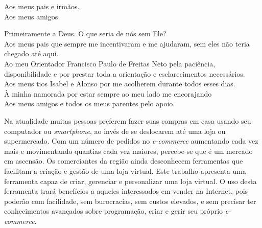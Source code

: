 \documentclass[a4paper,12pt]{monografia}
\begin{document}
%
  
%
\tecnologo {} 
%
 
\unidadeacademica{}
%
%

\maketitle
\begin{dedicatoria}
Aos meus pais e irmãos.\\
Aos meus amigos\\
\end{dedicatoria}

\noindent Primeiramente a Deus. O que seria de nós sem Ele?	\\
Aos meus pais que sempre me incentivaram e me ajudaram, sem eles não teria chegado até aqui.\\
Ao meu Orientador Francisco Paulo de Freitas Neto pela paciência, disponibilidade e por prestar toda a orientação e esclarecimentos necessários.\\
Aos meus tios Isabel e Alonso por me acolherem durante todos esses dias.\\
À minha namorada por estar sempre ao meu lado me encorajando\\
Aos meus amigos e todos os meus parentes pelo apoio.

\newpage


Na atualidade muitas pessoas preferem fazer suas compras em casa usando seu computador ou \textit{smartphone}, ao invés de se deslocarem até uma loja ou supermercado. Com um número de pedidos no \textit{e-commerce} aumentando cada vez mais e movimentando quantias cada vez maiores, percebe-se que é um mercado em ascensão. Os comerciantes da região ainda desconhecem ferramentas que facilitam a criação e gestão de uma loja virtual. Este trabalho apresenta uma ferramenta capaz de criar, gerenciar e personalizar uma loja virtual. O uso desta ferramenta trará benefícios a aqueles interessados em vender na Internet, pois poderão com facilidade, sem burocracias, sem custos elevados, e sem precisar ter conhecimentos avançados sobre programação, criar e gerir seu próprio \textit{e-commerce}.
\end{document}

